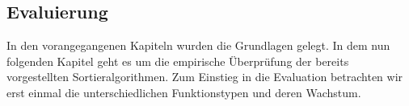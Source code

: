\documentclass{article}
\begin{document}



\newpage
\subsection{Evaluierung}
In den vorangegangenen Kapiteln wurden die Grundlagen gelegt. In dem nun folgenden Kapitel geht es um die empirische Überprüfung der bereits vorgestellten Sortieralgorithmen.
Zum Einstieg in die Evaluation betrachten wir erst einmal die unterschiedlichen Funktionstypen und deren Wachstum.
\end{document}
